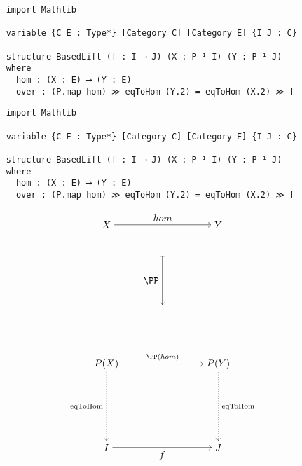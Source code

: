 \documentclass[landscape]{slides}
\begin{document}
\begin{slide}
  \par{}\baselineskip
  \begin{lstlisting}
    import Mathlib

    variable {C E : Type*} [Category C] [Category E] {I J : C}
    
    structure BasedLift (f : I ⟶ J) (X : P⁻¹ I) (Y : P⁻¹ J) 
    where
      hom : (X : E) ⟶ (Y : E)
      over : (P.map hom) ≫ eqToHom (Y.2) = eqToHom (X.2) ≫ f  
  \end{lstlisting}

  
\end{slide}

\begin{slide}
  \par{}\baselineskip
  \begin{lstlisting}
    import Mathlib
    
    variable {C E : Type*} [Category C] [Category E] {I J : C}

    structure BasedLift (f : I ⟶ J) (X : P⁻¹ I) (Y : P⁻¹ J) 
    where
      hom : (X : E) ⟶ (Y : E)
      over : (P.map hom) ≫ eqToHom (Y.2) = eqToHom (X.2) ≫ f  
  \end{lstlisting}

  \par{}\baselineskip

  \[
  \begin{tikzpicture}[baseline=(b0l.base),scale=1,every node/.style={transform shape}]
  \node(tl) at (0,2) {$X$};
  \node(tr) at (4,2) {$Y$};
  \node(b0l) at (0,-3) {$P(X)$};
  \node(b0r) at (4,-3) {$P(Y)$};
  \node(b1l) at (0,-6) {$I$};
  \node(b1r) at (4,-6) {$J$};
  \node(tc) at (2,1) {} ;
  \node(bc) at (2,-1) {} ;
  \draw[->] (tl) to node(tar){} node[above]{$hom$} (tr);
  \draw[->] (b0l) to node(bar){} node[above]{\scriptsize$\PP (hom)$} (b0r);
  \draw[->] (b1l) to node(bar){} node[below]{$f$} (b1r);
  \draw[|->] (tc) to node(mid){} node[left]{$\PP$} (bc); 
  \draw[->,dotted] (b0l) to node(lar){} node[left]{\scriptsize  eqToHom} (b1l);
  \draw[->,dotted] (b0r) to node(rar){} node[right]{\scriptsize  eqToHom} (b1r);
  \end{tikzpicture}
  \]
\end{slide}  
\end{document}
